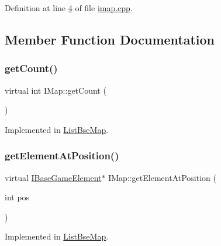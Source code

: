 Definition at line \hyperlink{a00050_source_l00004}{4} of file \hyperlink{a00050_source}{imap.\+cpp}.



\subsection{Member Function Documentation}
\mbox{\label{a00165_a021e64b05ecb6558ed1d663676f82971}} 
\subsubsection{\texorpdfstring{get\+Count()}{getCount()}}
{\footnotesize\ttfamily virtual int I\+Map\+::get\+Count (\begin{DoxyParamCaption}{ }\end{DoxyParamCaption})\hspace{0.3cm}{\ttfamily [pure virtual]}}



Implemented in \hyperlink{a00169_a78e72bacec177f3512323c5fc7db11f3}{List\+Bse\+Map}.

\mbox{\label{a00165_a9fce1fb4ad8fac181fbbce3ce31da0a0}} 
\subsubsection{\texorpdfstring{get\+Element\+At\+Position()}{getElementAtPosition()}}
{\footnotesize\ttfamily virtual \hyperlink{a00137}{I\+Base\+Game\+Element}$\ast$ I\+Map\+::get\+Element\+At\+Position (\begin{DoxyParamCaption}\item[{int}]{pos }\end{DoxyParamCaption})\hspace{0.3cm}{\ttfamily [pure virtual]}}



Implemented in \hyperlink{a00169_a6725c6e4231705df32b1074b0b5fdda5}{List\+Bse\+Map}.

\mbox{\label{a00165_a183f2d7ba8ec154d0338e999f195d0c8}} 
